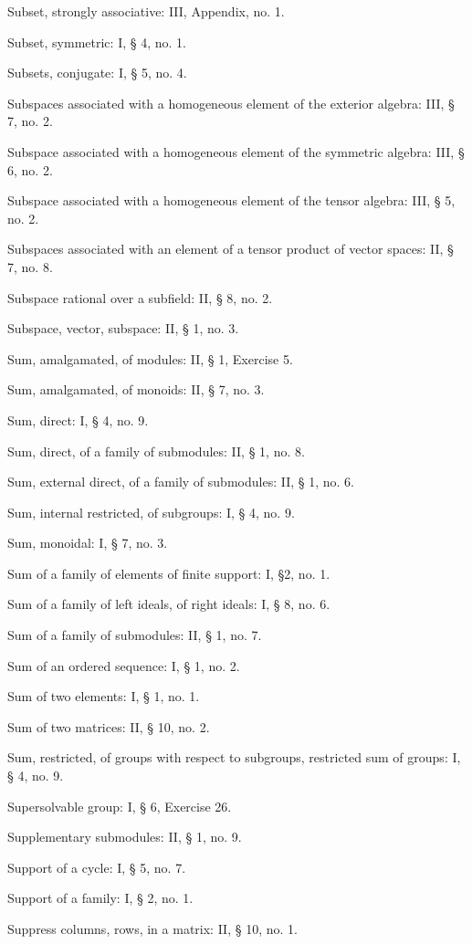 Subset, strongly associative: III, Appendix, no. 1.

Subset, symmetric: I, § 4, no. 1.

Subsets, conjugate: I, § 5, no. 4.

Subspaces associated with a homogeneous element of the exterior algebra: III, § 7, no. 2.

Subspace associated with a homogeneous element of the symmetric algebra: III, § 6, no. 2.

Subspace associated with a homogeneous element of the tensor algebra: III, § 5, no. 2.

Subspaces associated with an element of a tensor product of vector spaces: II, § 7, no. 8.

Subspace rational over a subfield: II, § 8, no. 2.

Subspace, vector, subspace: II, § 1, no. 3.

Sum, amalgamated, of modules: II, § 1, Exercise 5.

Sum, amalgamated, of monoids: II, § 7, no. 3.

Sum, direct: I, § 4, no. 9.

Sum, direct, of a family of submodules: II, § 1, no. 8.

Sum, external direct, of a family of submodules: II, § 1, no. 6.

Sum, internal restricted, of subgroups: I, § 4, no. 9.

Sum, monoidal: I, § 7, no. 3.

Sum of a family of elements of finite support: I, §2, no. 1.

Sum of a family of left ideals, of right ideals: I, § 8, no. 6.

Sum of a family of submodules: II, § 1, no. 7.

Sum of an ordered sequence: I, § 1, no. 2.

Sum of two elements: I, § 1, no. 1.

Sum of two matrices: II, § 10, no. 2.

Sum, restricted, of groups with respect to subgroups, restricted sum of groups: I, § 4, no. 9.

Supersolvable group: I, § 6, Exercise 26.

Supplementary submodules: II, § 1, no. 9.

Support of a cycle: I, § 5, no. 7.

Support of a family: I, § 2, no. 1.

Suppress columns, rows, in a matrix: II, § 10, no. 1.

